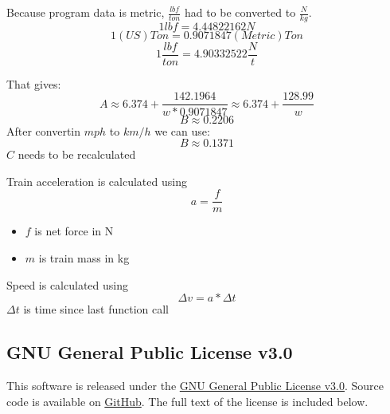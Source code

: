 \documentclass[12pt,a4paper]{report}
\begin{document}
Because program data is metric, $\frac{lbf}{ton}$ had to be converted to $\frac{N}{kg}$.
\[1 lbf = 4.44822162 N\]
\[1 (US)Ton = 0.9071847 (Metric)Ton\]
\[1\frac{lbf}{ton} = 4.90332522\frac{N}{t}\]

That gives:
\[A \approx 6.374 + \frac{142.1964}{w * 0.9071847} \approx 6.374 + \frac{128.99}{w}\]
\[B \approx 0.2206\]
After convertin $mph$ to $km/h$ we can use:
\[B \approx 0.1371\]
$C$ needs to be recalculated

Train acceleration is calculated using
\[a = \frac{f}{m}\]
\begin{itemize}
    \item $f$ is net force in N
    \item $m$ is train mass in kg
\end{itemize}

Speed is calculated using
\[\Delta v = a * \Delta t\]
$\Delta t$ is time since last function call

\begin{appendices}

\chapter{GNU General Public License v3.0}
\label{app:license}

This software is released under the \href{https://www.gnu.org/licenses/gpl-3.0.en.html#license-text}{GNU General Public License v3.0}. 
Source code is available on \href{https://github.com/grzeg2010/SimpleTrainSim}{GitHub}.
The full text of the license is included below.

\begin{singlespace}
    \small
    
\end{singlespace}

\end{appendices}
\end{document}
